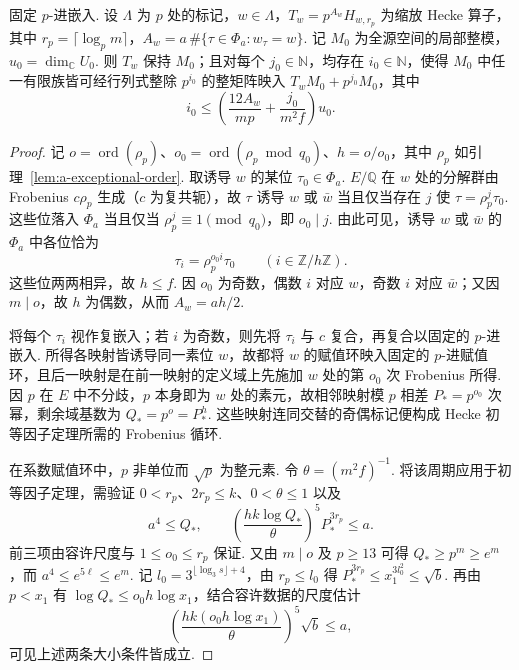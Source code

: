 \begin{lemma}
\label{lem:a-mark-single-colength}
\emitthmsource
固定 $p$-进嵌入. 设 $\Lambda$ 为 $p$ 处的标记，$w\in\Lambda$，$T_w=p^{A_w}H_{w,r_p}$ 为缩放 Hecke 算子，其中 $r_p=\lceil\log_p m\rceil$，$A_w=a\,\#\{\tau\in\Phi_a:w_\tau=w\}$. 记 $M_0$ 为全源空间的局部整模，$u_0=\dim_{\mathbb C}U_0$. 则 $T_w$ 保持 $M_0$；且对每个 $j_0\in\mathbb N$，均存在 $i_0\in\mathbb N$，使得 $M_0$ 中任一有限族皆可经行列式整除 $p^{i_0}$ 的整矩阵映入 $T_wM_0+p^{j_0}M_0$，其中
\[
 i_0\le
 \left(\frac{12A_w}{mp}+\frac{j_0}{m^2f}\right)u_0 .
\]
\end{lemma}
\begin{proof}
记 $o=\operatorname{ord}(\rho_p)$、$o_0=\operatorname{ord}(\rho_p\bmod q_0)$、$h=o/o_0$，其中 $\rho_p$ 如引理~\ref{lem:a-exceptional-order}. 取诱导 $w$ 的某位 $\tau_0\in\Phi_a$. $E/\mathbb Q$ 在 $w$ 处的分解群由 Frobenius $c\rho_p$ 生成（$c$ 为复共轭），故 $\tau$ 诱导 $w$ 或 $\bar w$ 当且仅当存在 $j$ 使 $\tau=\rho_p^j\tau_0$. 这些位落入 $\Phi_a$ 当且仅当 $\rho_p^j\equiv1\pmod{q_0}$，即 $o_0\mid j$. 由此可见，诱导 $w$ 或 $\bar w$ 的 $\Phi_a$ 中各位恰为
\[
 \tau_i=\rho_p^{o_0 i}\tau_0\qquad (i\in\mathbb Z/h\mathbb Z).
\]
这些位两两相异，故 $h\le f$. 因 $o_0$ 为奇数，偶数 $i$ 对应 $w$，奇数 $i$ 对应 $\bar w$；又因 $m\mid o$，故 $h$ 为偶数，从而 $A_w=ah/2$.

将每个 $\tau_i$ 视作复嵌入；若 $i$ 为奇数，则先将 $\tau_i$ 与 $c$ 复合，再复合以固定的 $p$-进嵌入. 所得各映射皆诱导同一素位 $w$，故都将 $w$ 的赋值环映入固定的 $p$-进赋值环，且后一映射是在前一映射的定义域上先施加 $w$ 处的第 $o_0$ 次 Frobenius 所得. 因 $p$ 在 $E$ 中不分歧，$p$ 本身即为 $w$ 处的素元，故相邻映射模 $p$ 相差 $P_*=p^{o_0}$ 次幂，剩余域基数为 $Q_*=p^o=P_*^h$. 这些映射连同交替的奇偶标记便构成 Hecke 初等因子定理所需的 Frobenius 循环.

在系数赋值环中，$p$ 非单位而 $\sqrt p$ 为整元素. 令 $\theta=(m^2f)^{-1}$. 将该周期应用于初等因子定理，需验证 $0<r_p$、$2r_p\le k$、$0<\theta\le1$ 以及
\[
 a^4\le Q_*,
 \qquad
 \left(\frac{h k\log Q_*}{\theta}\right)^5P_*^{3r_p}\le a.
\]
前三项由容许尺度与 $1\le o_0\le r_p$ 保证. 又由 $m\mid o$ 及 $p\ge13$ 可得 $Q_*\ge p^m\ge e^m$，而 $a^4\le e^{5\ell}\le e^m$. 记 $l_0=3^{\lfloor\log_3 s\rfloor+4}$，由 $r_p\le l_0$ 得 $P_*^{3r_p}\le x_1^{3l_0^2}\le\sqrt b$. 再由 $p<x_1$ 有 $\log Q_*\le o_0h\log x_1$，结合容许数据的尺度估计
\[
 \left(\frac{h k(o_0h\log x_1)}{\theta}\right)^5\sqrt b\le a,
\]
可见上述两条大小条件皆成立.


\end{proof}
